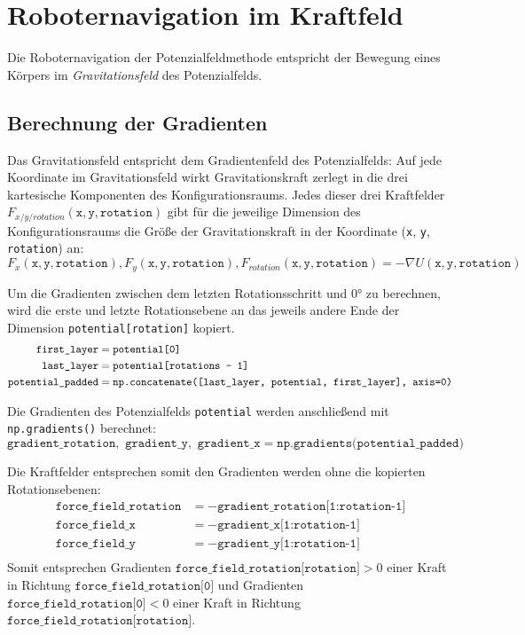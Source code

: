 \chapter{Roboternavigation im Kraftfeld}

Die Roboternavigation der Potenzialfeldmethode entspricht der Bewegung eines Körpers im \textit{Gravitationsfeld} des Potenzialfelds.

\section{Berechnung der Gradienten}

Das Gravitationsfeld entspricht dem Gradientenfeld des Potenzialfelds: Auf jede Koordinate im Gravitationsfeld wirkt Gravitationskraft zerlegt in die drei kartesische Komponenten des Konfigurationsraums. Jedes dieser drei Kraftfelder $F_{x/y/rotation}(\texttt{x}, \texttt{y}, \texttt{rotation})$ gibt für die jeweilige Dimension des Konfigurationsraums die Größe der Gravitationskraft in der Koordinate (\texttt{x}, \texttt{y}, \texttt{rotation}) an:
\begin{equation*}
 F_{x}(\texttt{x}, \texttt{y}, \texttt{rotation}), F_{y}(\texttt{x}, \texttt{y}, \texttt{rotation}), F_{rotation}(\texttt{x}, \texttt{y}, \texttt{rotation}) = -\nabla U(\texttt{x}, \texttt{y}, \texttt{rotation})
\end{equation*}

Um die Gradienten zwischen dem letzten Rotationsschritt und $0$° zu berechnen, wird die erste und letzte Rotationsebene an das jeweils andere Ende der Dimension \texttt{potential[rotation]} kopiert.
\begin{align*}
	\texttt{first\_layer} & = \texttt{potential[0]} \\
    \texttt{last\_layer} & = \texttt{potential[\texttt{rotations - 1}]} \\
	\texttt{potential\_padded} & = \texttt{np.concatenate([last\_layer, potential, first\_layer], axis=0)}
\end{align*}

Die Gradienten des Potenzialfelds \texttt{potential} werden anschließend mit \texttt{np.gradients()} berechnet:
\begin{equation*}
 \texttt{gradient\_rotation}, \texttt{ gradient\_y}, \texttt{ gradient\_x} = \texttt{np.gradients(potential\_padded)}
\end{equation*}

Die Kraftfelder entsprechen somit den Gradienten werden ohne die kopierten Rotationsebenen:
\begin{align*}
	\texttt{force\_field\_rotation} & = -\texttt{gradient\_rotation[1:rotation-1]} \\
    \texttt{force\_field\_x} & = -\texttt{gradient\_x[1:rotation-1]} \\
	\texttt{force\_field\_y} & = -\texttt{gradient\_y[1:rotation-1]} \\
\end{align*}
Somit entsprechen Gradienten $ \texttt{force\_field\_rotation[rotation]} > 0 $ einer Kraft in Richtung $\texttt{force\_field\_rotation[0]}$ und Gradienten $ \texttt{force\_field\_rotation[0]} < 0 $ einer Kraft in Richtung $\texttt{force\_field\_rotation[rotation]}$.

